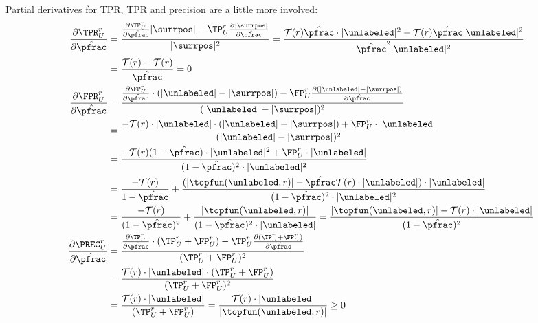 Partial derivatives for TPR, TPR and precision are a little more involved:
\begin{align}
\frac{\partial \TPR_U^r}{\partial \hat{\pfrac}} &= \frac{\frac{\partial \TP_U^r}{\partial \hat{\pfrac}} |\surrpos| - \TP_U^r \frac{\partial |\surrpos|}{\partial \hat{\pfrac}}}{|\surrpos|^2} 
= \frac{\mathcal{T}(r)\hat{\pfrac}\cdot|\unlabeled|^2-\mathcal{T}(r)\hat{\pfrac} |\unlabeled|^2}{\hat{\pfrac}^2|\unlabeled|^2} \nonumber \\
&= \frac{\mathcal{T}(r)-\mathcal{T}(r)}{\hat{\pfrac}} = 0 \label{eq:dtpr} \\
\frac{\partial \FPR_U^r}{\partial \hat{\pfrac}} &= \frac{\frac{\partial \FP_U^r}{\partial \hat{\pfrac}} \cdot (|\unlabeled|-|\surrpos|) - \FP_U^r \frac{\partial (|\unlabeled|-|\surrpos|)}{\partial \hat{\pfrac}}}{(|\unlabeled|-|\surrpos|)^2} \nonumber \\
&= \frac{-\mathcal{T}(r) \cdot |\unlabeled| \cdot (|\unlabeled|-|\surrpos|)+\FP_U^r \cdot |\unlabeled|}{(|\unlabeled|-|\surrpos|)^2} \nonumber \\
&=\frac{-\mathcal{T}(r) (1-\hat{\pfrac}) \cdot |\unlabeled|^2 + \FP_U^r \cdot |\unlabeled|}{(1-\hat{\pfrac})^2 \cdot |\unlabeled|^2} \nonumber \\
&=\frac{-\mathcal{T}(r)}{1-\hat{\pfrac}} + \frac{(|\topfun(\unlabeled, r)|-\hat{\pfrac}\mathcal{T}(r) \cdot |\unlabeled|) \cdot |\unlabeled|}{(1-\hat{\pfrac})^2 \cdot |\unlabeled|^2}  \nonumber \\
&=\frac{-\mathcal{T}(r)}{(1-\hat{\pfrac})^2} + \frac{|\topfun(\unlabeled, r)|}{(1-\hat{\pfrac})^2\cdot|\unlabeled|} 
= \frac{|\topfun(\unlabeled, r)| - \mathcal{T}(r) \cdot |\unlabeled|}{(1-\hat{\pfrac})^2} \label{eq:dfpr} \\
\frac{\partial \PREC_U^r}{\partial \hat{\pfrac}} &= \frac{\frac{\partial \TP_U^r}{\partial \hat{\pfrac}} \cdot (\TP_U^r+\FP_U^r) - \TP_U^r \frac{\partial (\TP_U^r+\FP_U^r)}{\partial \hat{\pfrac}}}{(\TP_U^r+\FP_U^r)^2} \nonumber \\ 
&= \frac{\mathcal{T}(r)\cdot|\unlabeled|\cdot(\TP_U^r + \FP_U^r)}{(\TP_U^r + \FP_U^r)^2} \nonumber \\
&= \frac{\mathcal{T}(r)\cdot|\unlabeled|}{(\TP_U^r + \FP_U^r)} = \frac{\mathcal{T}(r)\cdot|\unlabeled|}{|\topfun(\unlabeled,r)|} \geq 0 \label{eq:dprec} 
\end{align}

